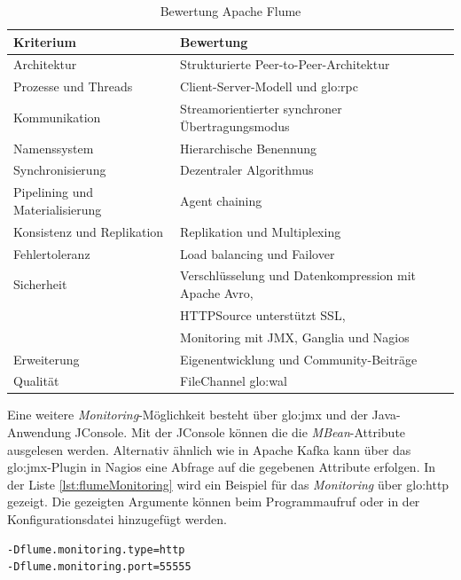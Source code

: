\begin{table}[ht!]
	\centering
		\begin{tabular}{@{}ll@{}} \toprule
			\textbf{Kriterium} & \textbf{Bewertung} \\ \midrule
			Architektur & Strukturierte Peer-to-Peer-Architektur \\
			Prozesse und Threads & Client-Server-Modell und \gls{glo:rpc} \\
			Kommunikation & Streamorientierter synchroner Übertragungsmodus \\
			Namenssystem & Hierarchische Benennung \\
			Synchronisierung & Dezentraler Algorithmus \\
			Pipelining und Materialisierung & Agent chaining \\
			Konsistenz und Replikation & Replikation und Multiplexing \\
			Fehlertoleranz & Load balancing und Failover \\ 
			Sicherheit & Verschlüsselung und Datenkompression mit Apache Avro, \\			
			& HTTPSource unterstützt SSL, \\
			& Monitoring mit JMX, Ganglia und Nagios\\
			Erweiterung & Eigenentwicklung und Community-Beiträge \\
			Qualität & FileChannel \gls{glo:wal} \\
			\bottomrule			
		\end{tabular}
	\caption{Bewertung Apache Flume}
	\label{tab:bewflume}
\end{table}

Eine weitere \textit{Monitoring}-Möglichkeit besteht über \gls{glo:jmx} und der Java-Anwendung JConsole. Mit der JConsole können die die \textit{MBean}-Attribute ausgelesen werden. Alternativ ähnlich wie in Apache Kafka kann über das \gls{glo:jmx}-Plugin in Nagios eine Abfrage auf die gegebenen Attribute erfolgen. In der Liste \ref{lst:flumeMonitoring} wird ein Beispiel für das \textit{Monitoring} über \gls{glo:http} gezeigt. Die gezeigten Argumente können beim Programmaufruf oder in der Konfigurationsdatei hinzugefügt werden. 


\begin{lstlisting}[language=BASH, label=lst:flumeMonitoring, caption=Apache Flume Monitoring]
-Dflume.monitoring.type=http
-Dflume.monitoring.port=55555
\end{lstlisting}

